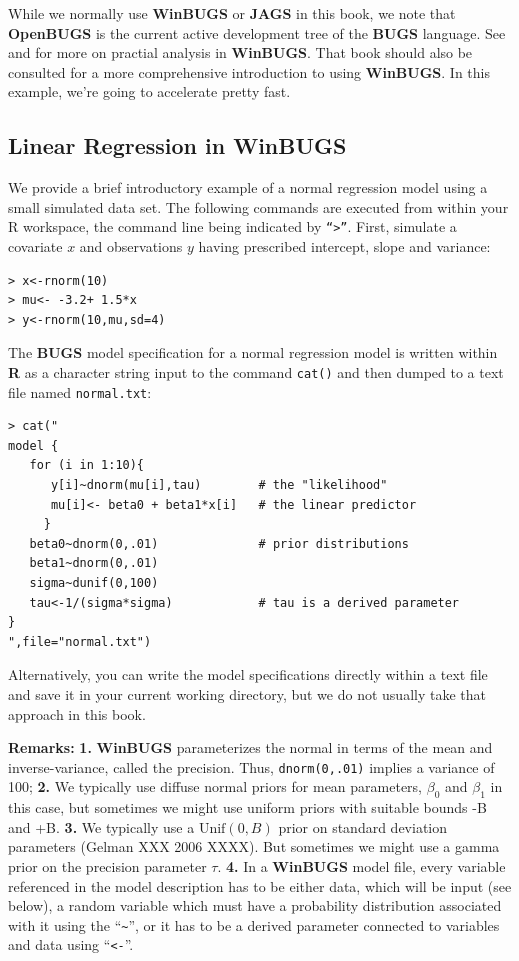 While we normally use
{\bf WinBUGS} or {\bf JAGS} in this book, we note that {\bf
 OpenBUGS} is the current active development tree of the {\bf BUGS}
language. See \citet[][ch.xyz]{kery:2010} and
\citet[][appendix xyz]{kery_schaub:2011} for more on practial analysis
in {\bf WinBUGS}.
That book should also be consulted
for a more comprehensive introduction to using {\bf WinBUGS}. In this
example, we're going to accelerate pretty fast.

\subsection{Linear Regression in WinBUGS}

We provide a brief introductory example of a normal regression model
using a small simulated data set. The following commands are executed
from within your R workspace, the command line being indicated by
\mbox{\tt ``>''}. First, simulate a covariate $x$ and observations $y$ having
prescribed intercept, slope and variance:
\begin{verbatim}
> x<-rnorm(10)
> mu<- -3.2+ 1.5*x
> y<-rnorm(10,mu,sd=4)
\end{verbatim}
The {\bf BUGS} model specification for a normal regression model is
written within {\bf R} as a character string input to the command
\mbox{\tt cat()} and
then dumped to a text file named \mbox{\tt normal.txt}:
\begin{verbatim}
> cat("
model {
   for (i in 1:10){
      y[i]~dnorm(mu[i],tau)        # the "likelihood"
      mu[i]<- beta0 + beta1*x[i]   # the linear predictor
     }
   beta0~dnorm(0,.01)              # prior distributions
   beta1~dnorm(0,.01)
   sigma~dunif(0,100)
   tau<-1/(sigma*sigma)            # tau is a derived parameter
}
",file="normal.txt")
\end{verbatim}
Alternatively, you
can write the model specifications directly within a text file and
save it in your current working directory, but we do not usually take
that approach in this book.

{\bf Remarks:} {\bf 1.} {\bf WinBUGS} parameterizes the normal in
terms of the mean and inverse-variance, called the precision. Thus,
\mbox{\tt dnorm(0,.01)} implies a variance of 100;
{\bf 2.} We typically use diffuse normal priors for mean parameters, $\beta_0$ and $\beta_1$ in this case, but sometimes we might use uniform priors with suitable bounds -B and +B.
{\bf 3.} We typically use a $\mbox{Unif}(0,B)$ prior on standard
deviation parameters
(Gelman XXX 2006 XXXX). But sometimes we might use a gamma prior on the precision parameter $\tau$.
{\bf 4.} In a {\bf WinBUGS} model file, every variable referenced in
the model description has to be
either data, which will be input (see below), a random variable which
must have a probability distribution associated with it using the
``\verb#~#'', or it has to be a derived parameter connected to variables and
data using ``\mbox{\tt <-}''.


